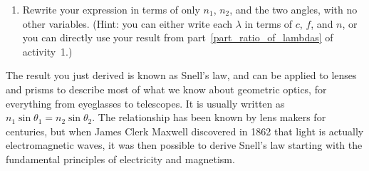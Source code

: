 \begin{enumerate}
\item Rewrite your expression in terms of only $n_1$, $n_2$, and the two angles, with no other variables.  (Hint: you can either write each $\lambda$ in terms of $c$, $f$, and $n$, or you can directly use your result from part~\ref{part_ratio_of_lambdas} of activity~1.)
\answerspace{0.8in}
\end{enumerate}
\newpage

The result you just derived is known as Snell's law, and can be applied to lenses and prisms to describe most of what we know about geometric optics, for everything from eyeglasses to telescopes.  It is usually written as $n_1\sin\theta_1 = n_2\sin\theta_2$.  The relationship has been known by lens makers for centuries, but when James Clerk Maxwell discovered in 1862 that light is actually electromagnetic waves, it was then possible to derive Snell's law starting with the fundamental principles of electricity and magnetism.

